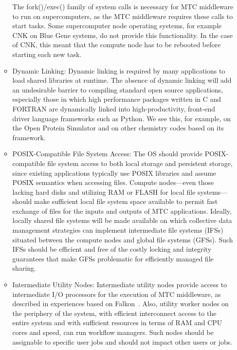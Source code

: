 \documentclass[10pt,letterpaper]{article}
\begin{document}
\begin{itemize}
\begin{itemize}
	  The fork()/exec() family of system calls is necessary for MTC middleware to run on supercomputers, as the MTC middleware requires these calls to
          start tasks.
          Some supercomputer node operating systems, for example CNK on
          Blue Gene systems, do not provide this functionality.  In
          the case of CNK, this meant that the compute node has to be rebooted
          before starting each new task.
	\item Dynamic Linking: 
	  Dynamic linking is required by many applications to load shared libraries at runtime. The absence of dynamic linking will add an undesirable barrier to compiling standard open source applications, especially those in which high performance packages written in C and FORTRAN are dynamically linked into high-productivity, front-end driver language frameworks such as Python. We see this, for example, on the Open Protein Simulator and on other chemistry codes based on its framework.
	\item POSIX-Compatible File System Access:
The OS should provide POSIX-compatible file system access to both local storage and persistent storage, since existing applications typically use POSIX libraries and assume POSIX
          semantics when accessing files.  Compute nodes---even those lacking hard disks and utilizing RAM or FLASH for local file systems---should make sufficient local file system space available to permit fast exchange of files for the inputs and outputs of MTC applications. Ideally, locally shared file systems will be made available on which collective data management strategies can implement intermediate file systems (IFSs) situated between the compute nodes and global file systems (GFSs). Such IFSs should be efficient and free of the costly locking and integrity guarantees that make GFSs problematic for efficiently managed file sharing.
          \item Intermediate Utility Nodes:
          Intermediate utility nodes provide access to intermediate I/O processors for the execution of MTC middleware, as described in experiences based on Falkon~\cite{FALKON-SC-08}. Also, utility worker nodes on the periphery of the system, with efficient interconnect access to the entire system and with sufficient resources in terms of RAM and CPU cores and speed, can run workflow managers. Such nodes should be assignable to specific user jobs and should not impact other users or jobs.


\end{itemize}
\end{itemize}
\end{document}
